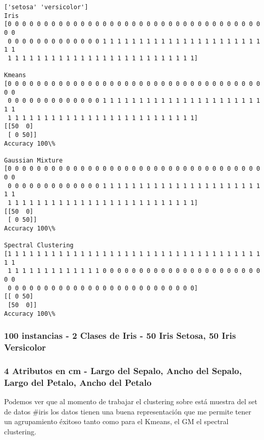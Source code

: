 \documentclass[11pt]{article}
\begin{document}
    \begin{Verbatim}[commandchars=\\\{\}]
['setosa' 'versicolor']
Iris
[0 0 0 0 0 0 0 0 0 0 0 0 0 0 0 0 0 0 0 0 0 0 0 0 0 0 0 0 0 0 0 0 0 0 0 0 0
 0 0 0 0 0 0 0 0 0 0 0 0 0 1 1 1 1 1 1 1 1 1 1 1 1 1 1 1 1 1 1 1 1 1 1 1 1
 1 1 1 1 1 1 1 1 1 1 1 1 1 1 1 1 1 1 1 1 1 1 1 1 1 1]

Kmeans
[0 0 0 0 0 0 0 0 0 0 0 0 0 0 0 0 0 0 0 0 0 0 0 0 0 0 0 0 0 0 0 0 0 0 0 0 0
 0 0 0 0 0 0 0 0 0 0 0 0 0 1 1 1 1 1 1 1 1 1 1 1 1 1 1 1 1 1 1 1 1 1 1 1 1
 1 1 1 1 1 1 1 1 1 1 1 1 1 1 1 1 1 1 1 1 1 1 1 1 1 1]
[[50  0]
 [ 0 50]]
Accuracy 100\%

Gaussian Mixture
[0 0 0 0 0 0 0 0 0 0 0 0 0 0 0 0 0 0 0 0 0 0 0 0 0 0 0 0 0 0 0 0 0 0 0 0 0
 0 0 0 0 0 0 0 0 0 0 0 0 0 1 1 1 1 1 1 1 1 1 1 1 1 1 1 1 1 1 1 1 1 1 1 1 1
 1 1 1 1 1 1 1 1 1 1 1 1 1 1 1 1 1 1 1 1 1 1 1 1 1 1]
[[50  0]
 [ 0 50]]
Accuracy 100\%

Spectral Clustering
[1 1 1 1 1 1 1 1 1 1 1 1 1 1 1 1 1 1 1 1 1 1 1 1 1 1 1 1 1 1 1 1 1 1 1 1 1
 1 1 1 1 1 1 1 1 1 1 1 1 1 0 0 0 0 0 0 0 0 0 0 0 0 0 0 0 0 0 0 0 0 0 0 0 0
 0 0 0 0 0 0 0 0 0 0 0 0 0 0 0 0 0 0 0 0 0 0 0 0 0 0]
[[ 0 50]
 [50  0]]
Accuracy 100\%

    \end{Verbatim}

    \subsubsection{100 instancias - 2 Clases de Iris - 50 Iris Setosa, 50
Iris
Versicolor}\label{instancias---2-clases-de-iris---50-iris-setosa-50-iris-versicolor}

\subsubsection{4 Atributos en cm - Largo del Sepalo, Ancho del Sepalo,
Largo del Petalo, Ancho del
Petalo}\label{atributos-en-cm---largo-del-sepalo-ancho-del-sepalo-largo-del-petalo-ancho-del-petalo}

Podemos ver que al momento de trabajar el clustering sobre está muestra
del set de datos \#iris los datos tienen una buena representación que me
permite tener un agrupamiento éxitoso tanto como para el Kmeans, el GM
el spectral clustering.
\end{document}
